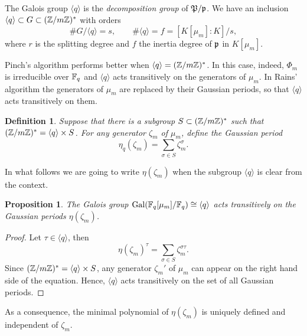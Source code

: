 \documentclass{article}
\newtheorem{Def}{Definition}
\newtheorem{Prop}{Proposition}
\begin{document}
The Galois group $\langle q\rangle$ is the \emph{decomposition group}
of $\frak{P}/\frak{p}$. We have an inclusion $\langle q\rangle\subset
G\subset(\mathbb{Z}/m\mathbb{Z})^\ast$ with orders
\begin{equation} \# G/\langle q\rangle = s,\qquad \#\langle q\rangle =
f = [K[\mu_m]:K]/s,
\end{equation}
where $r$ is the splitting degree and $f$ the inertia degree of
$\frak{p}$ in $K[\mu_m]$.

Pinch's algorithm performs better when $\langle q\rangle =
(\mathbb{Z}/m\mathbb{Z})^\ast$. In this case, indeed, $\Phi_m$ is irreducible over
$\mathbb{F}_q$ and $\langle q\rangle$ acts transitively on the generators of
$\mu_m$. In Rains' algorithm the generators of $\mu_m$ are replaced by
their Gaussian periods, so that $\langle q\rangle$ acts transitively
on them.

\begin{Def}
  \label{def:period}
  Suppose that there is a subgroup $S\subset (\mathbb{Z}/m\mathbb{Z})^\ast$ such that
  $(\mathbb{Z}/m\mathbb{Z})^\ast = \langle q\rangle\times S$. For any generator
  $\zeta_m$ of $\mu_m$, define the Gaussian period
  \begin{equation}
    \label{eq:period} \eta_q(\zeta_m) = \sum_{\sigma\in
S}\zeta_m^\sigma.
\end{equation}
\end{Def}

In what follows we are going to write $\eta(\zeta_m)$ when the
subgroup $\langle q\rangle$ is clear from the context.

\begin{Prop}
  The Galois group $\operatorname{Gal}(\mathbb{F}_q[\mu_m]/\mathbb{F}_q)\cong\langle q\rangle$ acts
  transitively on the Gaussian periods $\eta(\zeta_m)$.
\end{Prop}
\begin{proof}
  Let $\tau\in\langle q\rangle$, then
  \begin{equation} \eta(\zeta_m)^\tau = \sum_{\sigma\in S}
\zeta_m^{\sigma\tau}.
  \end{equation}
  Since $(\mathbb{Z}/m\mathbb{Z})^\ast=\langle q\rangle\times S$, any generator
  $\zeta_m'$ of $\mu_m$ can appear on the right hand side of the
  equation. Hence, $\langle q\rangle$ acts transitively on the set of
  all Gaussian periods.
\end{proof}

As a consequence, the minimal polynomial of $\eta(\zeta_m)$ is
uniquely defined and independent of $\zeta_m$.
\end{document}
